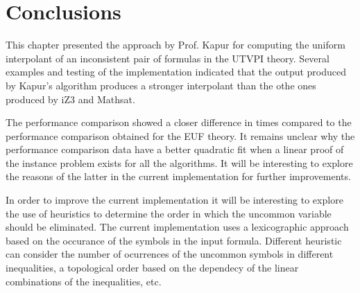 \section{Conclusions}

This chapter presented the approach
by Prof. Kapur for computing
the uniform interpolant of an inconsistent
pair of formulas in the UTVPI theory.
Several examples and testing of the implementation
indicated that the output produced by Kapur's
algorithm produces a stronger interpolant 
than the othe ones produced by iZ3 and Mathsat.

The performance comparison showed a closer
difference in times compared to the performance 
comparison obtained for the EUF theory. 
It remains unclear why the performance comparison
data have a better quadratic fit when a linear
proof of the instance problem exists for 
all the algorithms. It will be interesting
to explore the reasons of the latter in the current
implementation for further improvements.

In order to improve the current implementation it
will be interesting to explore the use of heuristics to 
determine the order in which the uncommon variable 
should be eliminated. The current implementation uses
a lexicographic approach based on the occurance of the
symbols in the input formula. Different heuristic
can consider the number of ocurrences of the uncommon
symbols in different inequalities, a topological order
based on the dependecy of the linear combinations of
the inequalities, etc. 


